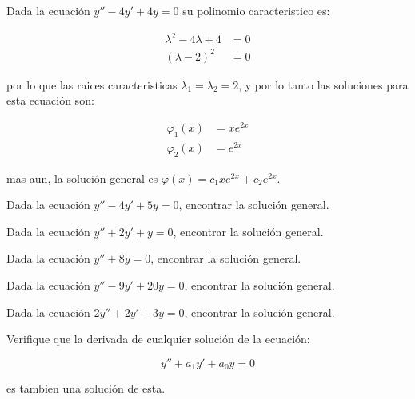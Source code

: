 		\begin{ejemplo}
			Dada la ecuación $y'' - 4 y' + 4 y = 0$ su polinomio caracteristico es:

			\begin{align*}
				\lambda^2 - 4 \lambda + 4 &= 0 \\
				(\lambda - 2)^2 &= 0
			\end{align*}

			por lo que las raices caracteristicas $\lambda_1 = \lambda_2 = 2$, y por lo tanto las soluciones para esta ecuación son:

			\begin{align*}
				\varphi_1(x) &= x e^{2x} \\
				\varphi_2(x) &= e^{2x}
			\end{align*}

			mas aun, la solución general es $\varphi(x) = c_1 x e^{2x} + c_2 e^{2x}$.
		\end{ejemplo}

		\begin{ejercicio}
			Dada la ecuación $y'' - 4 y' + 5 y = 0$, encontrar la solución general.
		\end{ejercicio}

		\begin{ejercicio}
			Dada la ecuación $y'' + 2 y' + y = 0$, encontrar la solución general.
		\end{ejercicio}

		\begin{ejercicio}
			Dada la ecuación $y'' + 8 y = 0$, encontrar la solución general.
		\end{ejercicio}

		\begin{ejercicio}
			Dada la ecuación $y'' - 9 y' + 20 y = 0$, encontrar la solución general.
		\end{ejercicio}

		\begin{ejercicio}
			Dada la ecuación $2 y'' + 2 y' + 3 y = 0$, encontrar la solución general.
		\end{ejercicio}

		\begin{ejercicio}
			Verifique que la derivada de cualquier solución de la ecuación:

			\begin{equation*}
				y'' + a_1 y' + a_0 y = 0
			\end{equation*}

			es tambien una solución de esta.
		\end{ejercicio}

